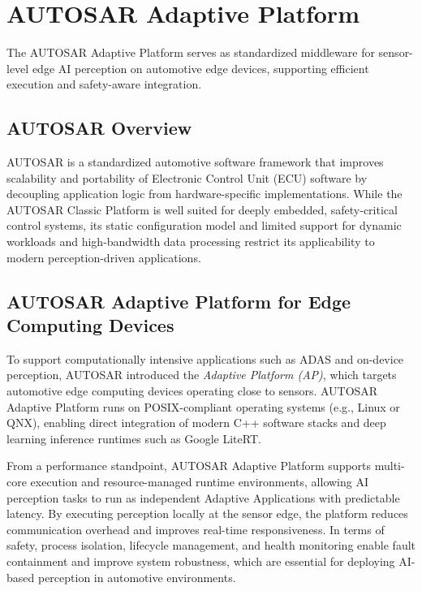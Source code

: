 

\section{AUTOSAR Adaptive Platform}
\label{sec:autosar}

The AUTOSAR Adaptive Platform serves as standardized middleware for sensor-level edge AI perception on automotive edge devices, supporting efficient execution and safety-aware integration.

\subsection{AUTOSAR Overview}
AUTOSAR is a standardized automotive software framework that improves scalability and portability of Electronic Control Unit (ECU) software by decoupling application logic from hardware-specific implementations. While the AUTOSAR Classic Platform is well suited for deeply embedded, safety-critical control systems, its static configuration model and limited support for dynamic workloads and high-bandwidth data processing restrict its applicability to modern perception-driven applications.

\subsection{AUTOSAR Adaptive Platform for Edge Computing Devices}
To support computationally intensive applications such as ADAS and on-device perception, AUTOSAR introduced the \textit{Adaptive Platform (AP)}, which targets automotive edge computing devices operating close to sensors. AUTOSAR Adaptive Platform runs on POSIX-compliant operating systems (e.g., Linux or QNX), enabling direct integration of modern C++ software stacks and deep learning inference runtimes such as Google LiteRT.

From a performance standpoint, AUTOSAR Adaptive Platform supports multi-core execution and resource-managed runtime environments, allowing AI perception tasks to run as independent Adaptive Applications with predictable latency. By executing perception locally at the sensor edge, the platform reduces communication overhead and improves real-time responsiveness. In terms of safety, process isolation, lifecycle management, and health monitoring enable fault containment and improve system robustness, which are essential for deploying AI-based perception in automotive environments.

